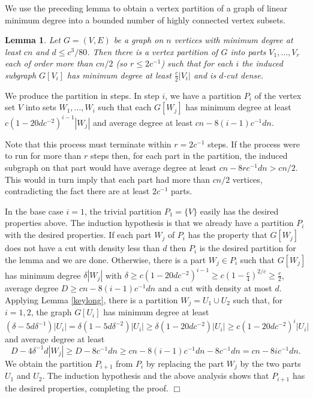 \documentclass[11pt]{article}
\newtheorem{lemma}[theorem]{Lemma}
\newenvironment{proof}
      {\medskip\noindent{\bf Proof:}\hspace{1mm}}
      {\hfill$\Box$\medskip}
\begin{document}
We use the preceding lemma to obtain a vertex partition of a graph of linear minimum degree into a bounded number of highly connected vertex subsets.

\begin{lemma}\label{lempartcutdense}
Let $G=(V,E)$ be a graph on $n$ vertices with minimum degree at least $cn$ and $d \leq c^3/80$. Then there
is a vertex partition of $G$ into parts $V_1,\ldots,V_r$ each of order more than $cn/2$ (so $r \leq 2c^{-1} $) such that for each $i$ the induced subgraph $G[V_i]$ has minimum degree at least $\frac{c}{2}|V_i|$ and is $d$-cut dense.
\end{lemma}
\begin{proof}
We produce the partition in steps. In step $i$, we have a
partition $P_i$ of the vertex set $V$ into sets $W_1,...,W_i$ such that
each $G[W_j]$ has minimum degree at least $c(1-20dc^{-2})^{i-1}|W_j|$ and average degree at least $cn-8(i-1)c^{-1}dn$.

Note that this process must terminate within $r=2c^{-1}$ steps. If the process were to run for more than $r$ steps then, for each part in the partition, the induced subgraph on that part would have average degree at least $cn-8rc^{-1}dn > cn/2$. This would in turn imply that each part had more than $cn/2$ vertices, contradicting the fact there are at least $2 c^{-1}$ parts.

In the base case $i=1$, the trivial partition $P_1=\{V\}$ easily has the desired properties above. The induction hypothesis is that we already have a partition $P_i$ with the desired properties. If each part $W_j$ of $P_i$ has the property that $G[W_j]$ does not have a cut with density less than $d$ then $P_i$ is the desired partition for the lemma and we are done. Otherwise, there is a part $W_j \in P_i$  such that $G[W_j]$ has minimum degree $\delta|W_j|$ with $\delta \geq c(1-20dc^{-2})^{i-1} \geq c(1-\frac{c}{4})^{2/c} \geq \frac{c}{2}$, average degree $D \geq cn-8(i-1)c^{-1}dn$ and a cut with density at most $d$. Applying Lemma \ref{keylong}, there is a partition $W_j=U_1 \cup U_2$ such that, for $i=1,2$, the graph $G[U_i]$ has minimum degree at least
$$(\delta -5d \delta^{-1})|U_i| = \delta(1-5d\delta^{-2})|U_i|\geq \delta(1-20dc^{-2})|U_i| \geq c(1-20dc^{-2})^{i}|U_i|$$
and average degree at least
$$D-4\delta^{-1}d|W_j| \geq D-8c^{-1}dn \geq cn-8(i-1)c^{-1}dn-8c^{-1}dn=cn-8ic^{-1}dn.$$
We obtain the partition $P_{i+1}$ from $P_i$ by replacing the part $W_j$ by the two parts $U_1$ and $U_2$. The induction hypothesis and the above analysis shows that $P_{i+1}$ has the desired properties, completing the proof.
\end{proof}
\end{document}
